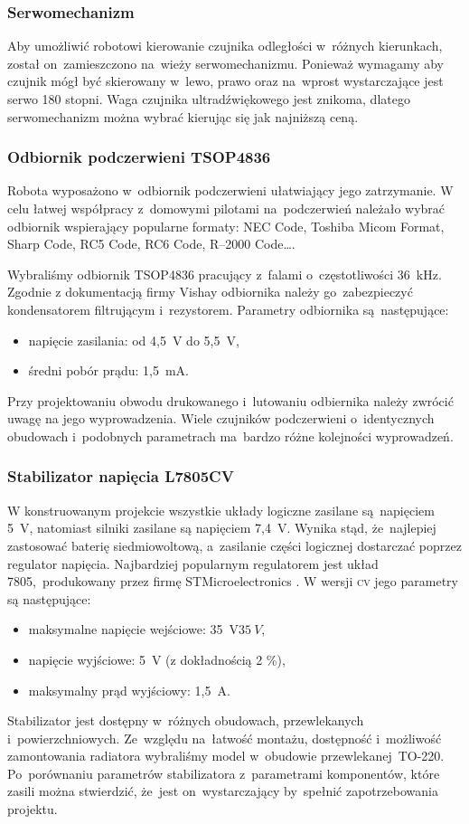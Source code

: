 \documentclass[11pt]{article}
\begin{document}
\subsubsection{Serwomechanizm}
Aby umożliwić robotowi kierowanie czujnika odległości w~różnych kierunkach, został on~zamieszczono na~wieży serwomechanizmu.
Ponieważ wymagamy aby czujnik mógł być skierowany w~lewo, prawo oraz na~wprost wystarczające jest serwo 180 stopni.
Waga czujnika ultradźwiękowego jest znikoma, dlatego serwomechanizm można wybrać kierując się jak najniższą ceną.

\subsubsection{Odbiornik podczerwieni TSOP4836}
Robota wyposażono w~odbiornik podczerwieni ułatwiający jego zatrzymanie.
W celu łatwej współpracy z~domowymi pilotami na~podczerwień należało wybrać odbiornik wspierający popularne formaty: NEC Code, Toshiba Micom Format, Sharp Code, RC5 Code, RC6 Code, R–2000 Code\dots.

Wybraliśmy odbiornik TSOP4836 pracujący z~falami o~częstotliwości 36~\si{\kilo\hertz}. Zgodnie z dokumentacją \cite{ir_datasheet} firmy Vishay
 odbiornika należy go~zabezpieczyć kondensatorem filtrującym i~rezystorem. Parametry odbiornika są~następujące:
\begin{itemize}
	\item napięcie zasilania: od 4,5~\si{\volt} do 5,5~\si{\volt},
	\item średni pobór prądu: 1,5~\si{\milli\ampere}.
\end{itemize}
Przy projektowaniu obwodu drukowanego i~lutowaniu odbiernika należy zwrócić uwagę na jego wyprowadzenia.
Wiele czujników podczerwieni o~identycznych obudowach i~podobnych parametrach ma~bardzo różne kolejności wyprowadzeń.

\subsubsection{Stabilizator napięcia L7805CV}
W konstruowanym projekcie wszystkie układy logiczne zasilane są~napięciem 5~\si{\volt}, natomiast silniki zasilane są napięciem  7,4~\si{\volt}.
Wynika stąd, że~najlepiej zastosować baterię siedmiowoltową, a~zasilanie części logicznej dostarczać poprzez regulator napięcia. Najbardziej popularnym regulatorem jest układ 7805,~produkowany przez firmę STMicroelectronics \cite{stab_datasheet}. 
W wersji \textsc{cv} jego parametry są następujące:
\begin{itemize}
	\item maksymalne napięcie wejściowe: 35~\si{\volt}$ 35\ V $,
	\item napięcie wyjściowe: 5~\si{\volt} (z dokładnością 2 \%),
	\item maksymalny prąd wyjściowy: 1,5~\si{\ampere}.
\end{itemize}
Stabilizator jest dostępny w~różnych obudowach, przewlekanych i~powierzchniowych. Ze~względu na~łatwość montażu, dostępność i~możliwość zamontowania radiatora wybraliśmy model w~obudowie przewlekanej~TO-220.
Po~porównaniu parametrów stabilizatora z~parametrami komponentów, które zasili można stwierdzić, że~jest on~wystarczający by~spełnić zapotrzebowania projektu.
\end{document}
